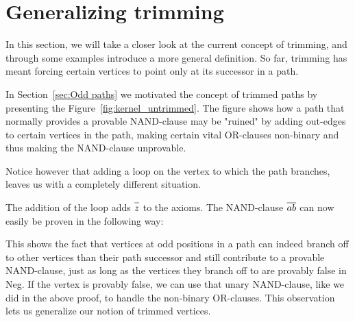 
\section{Generalizing trimming}
\label{sec:Generalizing trimming}
In this section, we will take a closer look at the current concept of trimming, and through some examples introduce a more general definition.
So far, trimming has meant forcing certain vertices to point only at its successor in a path.

In Section~\ref{sec:Odd paths} we motivated the concept of trimmed paths by presenting the Figure~\ref{fig:kernel_untrimmed}.
The figure shows how a path that normally provides a provable NAND-clause may be "ruined" by adding out-edges to certain vertices in the path, making certain vital OR-clauses non-binary and thus making the NAND-clause unprovable.

Notice however that adding a loop on the vertex to which the path branches, leaves us with a completely different situation.\par
\begin{figure}[!h]
  \centering
  \caption{}
  \label{fig:path_3_with_loop}
\end{figure}
The addition of the loop adds $\ol{z}$ to the axioms.
The NAND-clause $\ol{ab}$ can now easily be proven in the following way:\par
\begin{figure}[!h]
  \centering
  \begin{prooftree*}
  \end{prooftree*}
  \caption{}
  \label{fig:proof_loop}
\end{figure}
This shows the fact that vertices at odd positions in a path can indeed branch off to other vertices than their path successor and still contribute to a provable NAND-clause, just as long as the vertices they branch off to are provably false in Neg.
If the vertex is provably false, we can use that unary NAND-clause, like we did in the above proof, to handle the non-binary OR-clauses.
This observation lets us generalize our notion of trimmed vertices.

